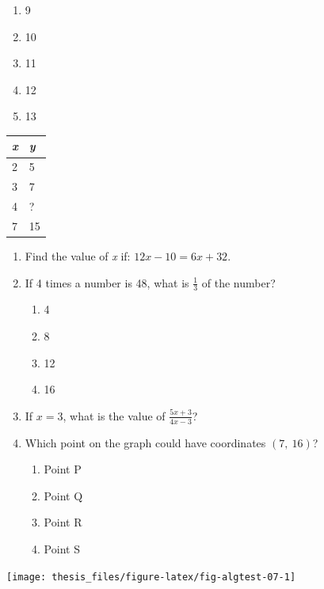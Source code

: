 \documentclass[11pt]{umnthesis}
\begin{document}
\begin{enumerate}
\def\labelenumi{\alph{enumi}.}
\tightlist
\item
  9
\item
  10
\item
  11
\item
  12
\item
  13
\end{enumerate}

\begin{longtable}[]{@{}ll@{}}
\toprule
\emph{x} & \emph{y} \\
\midrule
\endhead
2 & 5 \\
3 & 7 \\
4 & ? \\
7 & 15 \\
\bottomrule
\end{longtable}

\begin{enumerate}
\def\labelenumi{\arabic{enumi}.}
\setcounter{enumi}{3}
\item
  Find the value of \emph{x} if: \(12x - 10 = 6x + 32\).
\item
  If 4 times a number is 48, what is \(\frac{1}{3}\) of the number?

  \begin{enumerate}
  \def\labelenumii{\alph{enumii}.}
  \tightlist
  \item
    4
  \item
    8
  \item
    12
  \item
    16
  \end{enumerate}
\item
  If \(x=3\), what is the value of \(\frac{5x + 3}{4x - 3}\)?
\item
  Which point on the graph could have coordinates \((7,~16)\)?

  \begin{enumerate}
  \def\labelenumii{\alph{enumii}.}
  \tightlist
  \item
    Point P
  \item
    Point Q
  \item
    Point R
  \item
    Point S
  \end{enumerate}
\end{enumerate}

\begin{center}\texttt{[image: thesis\_files/figure-latex/fig-algtest-07-1]} \end{center}
\end{document}
